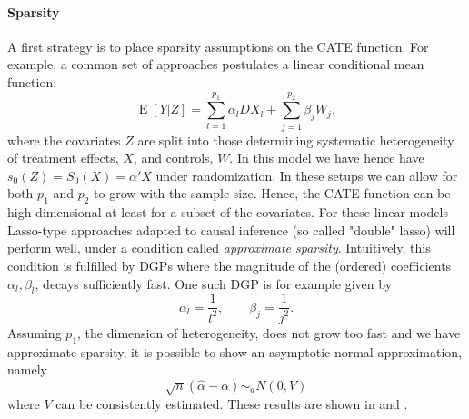 \documentclass[11pt, a4paper, leqno]{article}
\DeclareMathOperator{\E}{E}
\begin{document}
\paragraph*{Sparsity}
A first strategy is to place sparsity assumptions on the CATE function.
For example, a common set of approaches postulates a linear conditional mean function:
\begin{equation*}
    \E[Y|Z] = \sum_{l=1}^{p_1}\alpha_l DX_l + \sum_{j=1}^{p_2}\beta_j W_j,
\end{equation*}
where the covariates $Z$ are split into those determining systematic heterogeneity of treatment effects, $X$, and controls, $W$.
In this model we have hence have $s_0(Z) = S_0(X) = \alpha'X$ under randomization. In these setups we can allow for both $p_1$ and $p_2$ to grow with the sample size.
Hence, the CATE function can be high-dimensional at least for a subset of the covariates.
For these linear models Lasso-type approaches adapted to causal inference (so called "double" lasso) will perform well, under a condition called \textit{approximate sparsity}.
Intuitively, this condition is fulfilled by DGPs where the magnitude of the (ordered) coefficients $\alpha_l, \beta_l$, decays sufficiently fast.
One such DGP is for example given by
\begin{equation*}
    \alpha_l = \frac{1}{l^2}, \qquad \beta_j = \frac{1}{j^2}.
\end{equation*}
Assuming $p_1$, the dimension of heterogeneity, does not grow too fast and we have approximate sparsity, it is possible to show an asymptotic normal approximation, namely
\begin{equation*}
    \sqrt{n}(\hat{\alpha}-\alpha) \sim_a N(0,V)
\end{equation*}
where $V$ can be consistently estimated. These results are shown in \cite{belloni2015uniform} and \cite{belloni2018uniformly}.
\end{document}
